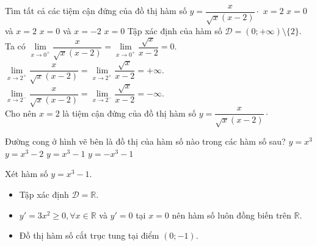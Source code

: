 \begin{ex}%
 Tìm tất cả các tiệm cận đứng của đồ thị hàm số $y=\dfrac{x}{\sqrt{x}(x-2)}\cdot$
 \choice
  {\True $x=2$}
  {$x=0$ và $x=2$}
  {$x=0$ và $x=-2$}
  {$x=0$}
 \loigiai
  {
  Tập xác định của hàm số $\mathscr{D} = (0;+\infty)\setminus\{2\}$.\\
  Ta có
  $\lim\limits_{x \to 0^+} \dfrac{x}{\sqrt{x}(x-2)} = \lim\limits_{x \to 0^+} \dfrac{\sqrt{x}}{x-2} = 0$.\\
  $\lim\limits_{x \to 2^+} \dfrac{x}{\sqrt{x}(x-2)} = \lim\limits_{x \to 2^+} \dfrac{\sqrt{x}}{x-2} = +\infty$.\\
  $\lim\limits_{x \to 2^-} \dfrac{x}{\sqrt{x}(x-2)} = \lim\limits_{x \to 2^-} \dfrac{\sqrt{x}}{x-2} = -\infty$.\\
  Cho nên $x = 2$ là tiệm cận đứng của đồ thị hàm số $y=\dfrac{x}{\sqrt{x}(x-2)}\cdot$
  }
\end{ex}


\begin{ex}%
 \immini
 {
 Đường cong ở hình vẽ bên là đồ thị của hàm số nào trong các hàm số sau?
 \choice
  {$y=x^3$}
  {$y=x^3-2$}
  {\True $y=x^3-1$}
  {$y=-x^3-1$}
 }
 {
 }
 \loigiai
  {
  Xét hàm số $y = x^3 - 1$.
  \begin{itemize}
   \item Tập xác định $\mathscr{D} = \mathbb{R}$.
   \item $y' = 3x^2 \geq 0, \forall x \in \mathbb{R}$ và $y'=0$ tại $x=0$ nên hàm số luôn đồng biến trên $\mathbb{R}$.
   \item Đồ thị hàm số cắt trục tung tại điểm $(0;-1)$.
  \end{itemize}
  }
\end{ex}



